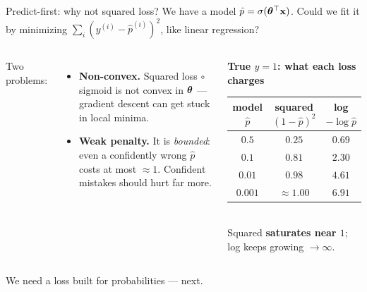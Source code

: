 \documentclass[aspectratio=169]{beamer}
\begin{document}
\begin{frame}{Predict-first: why not squared loss?}
  We have a model $\hat p = \sigma(\bm{\theta}^\top \mathbf{x})$. Could we fit it by minimizing
  $\sum_i (y^{(i)} - \hat p^{(i)})^2$, like linear regression?
  \begin{columns}[T]
    Two problems:
    \begin{itemize}\small
      \item \textbf{Non-convex.} Squared loss $\circ$ sigmoid is not convex in $\bm{\theta}$
        --- gradient descent can get stuck in local minima.
      \item \textbf{Weak penalty.} It is \emph{bounded}: even a confidently wrong $\hat p$
        costs at most $\approx 1$. Confident mistakes should hurt far more.
    \end{itemize}
    \begin{center}\scriptsize
    \textbf{True $y=1$: what each loss charges}\\[2pt]
    \renewcommand{\arraystretch}{1.25}
    \begin{tabular}{c c c}
      model $\hat p$ & squared $(1-\hat p)^2$ & log $-\log\hat p$ \\
      \hline
      $0.5$ & $0.25$ & $0.69$ \\
      $0.1$ & $0.81$ & $2.30$ \\
      $0.01$ & $0.98$ & $\mathbf{4.61}$ \\
      $0.001$ & $\approx 1.00$ & $\mathbf{6.91}$ \\
      \hline
    \end{tabular}\\[3pt]
    Squared \textbf{saturates near $1$}; log keeps growing $\to \infty$.
    \end{center}
  \end{columns}
  \vfill
  \footnotesize We need a loss built for probabilities --- next.
\end{frame}
\end{document}
